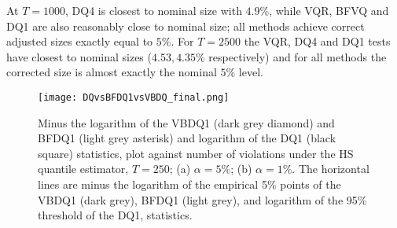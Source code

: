 \documentclass[12pt,epsf]{article}
\begin{document}
At $T=1000$, DQ4 is closest to nominal size with $4.9\%$, while VQR, BFVQ and DQ1 are also reasonably close to nominal size; all methods
achieve correct adjusted sizes exactly equal to $5\%$. For $T=2500$ the VQR, DQ4 and DQ1 tests have closest to nominal sizes
($4.53, 4.35\%$ respectively) and for all methods the corrected size is almost exactly the nominal $5\%$ level.

\begin{figure}[thp]
     \centering
      \texttt{[image: DQvsBFDQ1vsVBDQ\_final.png]}
\caption{\label{powerDQBF250} Minus the logarithm of the VBDQ1 (dark grey diamond) and BFDQ1 (light grey asterisk) and logarithm of the
DQ1 (black square) statistics, plot against number of violations under the HS quantile estimator, $T=250$; (a) $\alpha =5\%$; 
(b) $\alpha =1\%$. The horizontal lines are minus the logarithm of the empirical 5\% points of the VBDQ1 (dark grey), BFDQ1 (light grey), 
and logarithm of the 95\% threshold of the DQ1, statistics.}
\end{figure}
\end{document}
